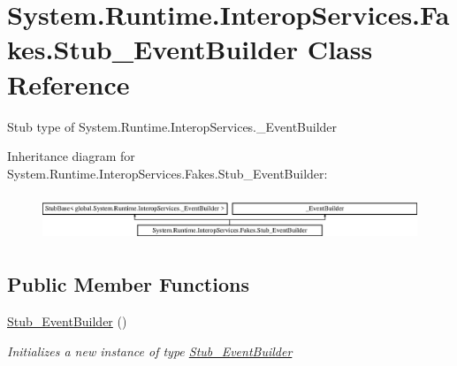 \hypertarget{class_system_1_1_runtime_1_1_interop_services_1_1_fakes_1_1_stub___event_builder}{\section{System.\-Runtime.\-Interop\-Services.\-Fakes.\-Stub\-\_\-\-Event\-Builder Class Reference}
\label{class_system_1_1_runtime_1_1_interop_services_1_1_fakes_1_1_stub___event_builder}
}


Stub type of System.\-Runtime.\-Interop\-Services.\-\_\-\-Event\-Builder 


Inheritance diagram for System.\-Runtime.\-Interop\-Services.\-Fakes.\-Stub\-\_\-\-Event\-Builder\-:\begin{figure}[H]
\begin{center}
\leavevmode
\includegraphics[height=1.403509cm]{class_system_1_1_runtime_1_1_interop_services_1_1_fakes_1_1_stub___event_builder}
\end{center}
\end{figure}
\subsection*{Public Member Functions}
\begin{DoxyCompactItemize}
\item 
\hyperlink{class_system_1_1_runtime_1_1_interop_services_1_1_fakes_1_1_stub___event_builder_a5a167c5d1640b876bd54389990a8ff22}{Stub\-\_\-\-Event\-Builder} ()
\begin{DoxyCompactList}\small\item\em Initializes a new instance of type \hyperlink{class_system_1_1_runtime_1_1_interop_services_1_1_fakes_1_1_stub___event_builder}{Stub\-\_\-\-Event\-Builder}\end{DoxyCompactList}\end{DoxyCompactItemize}
